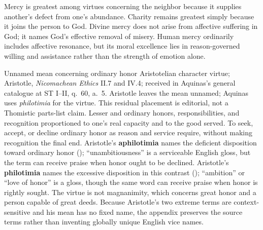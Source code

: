Mercy is greatest among virtues concerning the neighbor because it supplies another's defect from one's abundance. Charity remains greatest simply because it joins the person to God. Divine mercy does not arise from affective suffering in God; it names God's effective removal of misery. Human mercy ordinarily includes affective resonance, but its moral excellence lies in reason-governed willing and assistance rather than the strength of emotion alone.

\virtuedossier
  {Unnamed mean concerning ordinary honor}
  {Aristotelian character virtue; Aristotle, \emph{Nicomachean Ethics} II.7 and IV.4; received in Aquinas's general catalogue at ST I--II, q.~60, a.~5. Aristotle leaves the mean unnamed; Aquinas uses \emph{philotimia} for the virtue. This residual placement is editorial, not a Thomistic parts-list claim.}
  {Lesser and ordinary honors, responsibilities, and recognition proportioned to one's real capacity and to the good served.}
  {To seek, accept, or decline ordinary honor as reason and service require, without making recognition the final end.}
  {Aristotle's \textbf{aphilotimia} names the deficient disposition toward ordinary honor (); ``unambitiousness'' is a serviceable English gloss, but the term can receive praise when honor ought to be declined.}
  {Aristotle's \textbf{philotimia} names the excessive disposition in this contrast (); ``ambition'' or ``love of honor'' is a gloss, though the same word can receive praise when honor is rightly sought.}
  {The virtue is not magnanimity, which concerns great honor and a person capable of great deeds. Because Aristotle's two extreme terms are context-sensitive and his mean has no fixed name, the appendix preserves the source terms rather than inventing globally unique English vice names.}
